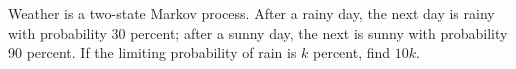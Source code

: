 Weather is a two-state Markov process. After a rainy day, the next day is rainy with probability 30 percent; after a sunny day, the next is sunny with probability 90 percent. If the limiting probability of rain is $k$ percent, find $10k$.
